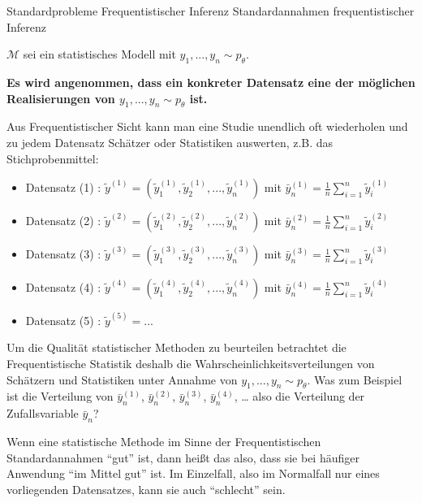 \documentclass[
  8pt,
  ignorenonframetext,
]{beamer}
\begin{document}
\begin{frame}{Standardprobleme Frequentistischer Inferenz}
\protect\hypertarget{standardprobleme-frequentistischer-inferenz-2}{}
Standardannahmen frequentistischer Inferenz

\footnotesize

\(\mathcal{M}\) sei ein statistisches Modell mit
\(y_1,...,y_n \sim p_\theta\).

\textbf{Es wird angenommen, dass ein konkreter Datensatz eine der
möglichen Realisierungen von \(y_1,...,y_n \sim p_\theta\) ist.}

Aus Frequentistischer Sicht kann man eine Studie unendlich oft
wiederholen und zu jedem Datensatz Schätzer oder Statistiken auswerten,
z.B. das Stichprobenmittel:

\footnotesize
\begin{itemize}
\item[] Datensatz (1) : $\tilde{y}^{(1)} = \left(\tilde{y}_1^{(1)}, \tilde{y}_2^{(1)}, ...,\tilde{y}_n^{(1)}\right)$
                        mit $\bar{y}_n^{(1)} = \frac{1}{n}\sum_{i=1}^n \tilde{y}_i^{(1)}$
\item[] Datensatz (2) : $\tilde{y}^{(2)} = \left(\tilde{y}_1^{(2)}, \tilde{y}_2^{(2)}, ...,\tilde{y}_n^{(2)}\right)$
                        mit $\bar{y}_n^{(2)} = \frac{1}{n}\sum_{i=1}^n \tilde{y}_i^{(2)}$
\item[] Datensatz (3) : $\tilde{y}^{(3)} = \left(\tilde{y}_1^{(3)}, \tilde{y}_2^{(3)}, ...,\tilde{y}_n^{(3)}\right)$
                        mit $\bar{y}_n^{(3)} = \frac{1}{n}\sum_{i=1}^n \tilde{y}_i^{(3)}$
\item[] Datensatz (4) : $\tilde{y}^{(4)} = \left(\tilde{y}_1^{(4)}, \tilde{y}_2^{(4)}, ...,\tilde{y}_n^{(4)}\right)$
                        mit $\bar{y}_n^{(4)} = \frac{1}{n}\sum_{i=1}^n \tilde{y}_i^{(4)}$
\item[] Datensatz (5) : $\tilde{y}^{(5)} = ...$
\end{itemize}

Um die Qualität statistischer Methoden zu beurteilen betrachtet die
Frequentistische Statistik deshalb die Wahrscheinlichkeitsverteilungen
von Schätzern und Statistiken unter Annahme von
\(y_1,...,y_n \sim p_\theta\). Was zum Beispiel ist die Verteilung von
\(\bar{y}_n^{(1)}\), \(\bar{y}_n^{(2)}\), \(\bar{y}_n^{(3)}\),
\(\bar{y}_n^{(4)}\), \ldots{} also die Verteilung der Zufallsvariable
\(\bar{y}_n\)?

Wenn eine statistische Methode im Sinne der Frequentistischen
Standardannahmen ``gut'' ist, dann heißt das also, dass sie bei häufiger
Anwendung ``im Mittel gut'' ist. Im Einzelfall, also im Normalfall nur
eines vorliegenden Datensatzes, kann sie auch ``schlecht'' sein.
\end{frame}
\end{document}
